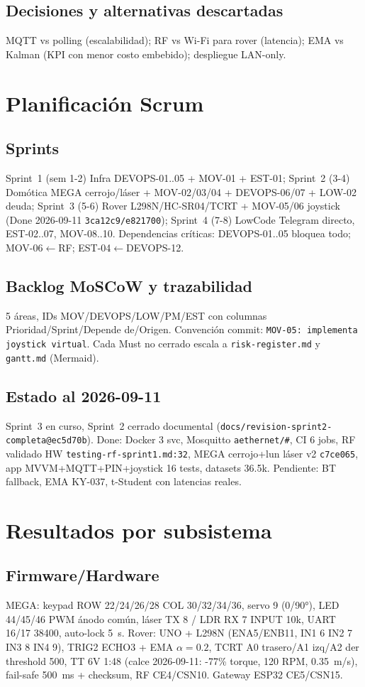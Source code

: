 \documentclass[conference]{IEEEtran}
\begin{document}
\subsection{Decisiones y alternativas descartadas}
MQTT vs polling (escalabilidad); RF vs Wi-Fi para rover (latencia); EMA vs Kalman (KPI con menor costo embebido); despliegue LAN-only.

\section{Planificación Scrum}
\subsection{Sprints}
Sprint~1 (sem 1-2) Infra DEVOPS-01..05 + MOV-01 + EST-01; Sprint~2 (3-4) Domótica MEGA cerrojo/láser + MOV-02/03/04 + DEVOPS-06/07 + LOW-02 deuda; Sprint~3 (5-6) Rover L298N/HC-SR04/TCRT + MOV-05/06 joystick (Done 2026-09-11 \texttt{3ca12c9/e821700}); Sprint~4 (7-8) LowCode Telegram directo, EST-02..07, MOV-08..10. Dependencias críticas: DEVOPS-01..05 bloquea todo; MOV-06$\leftarrow$RF; EST-04$\leftarrow$DEVOPS-12.

\subsection{Backlog MoSCoW y trazabilidad}
5 áreas, IDs MOV/DEVOPS/LOW/PM/EST con columnas Prioridad/Sprint/Depende de/Origen. Convención commit: \texttt{MOV-05: implementa joystick virtual}. Cada Must no cerrado escala a \texttt{risk-register.md} y \texttt{gantt.md} (Mermaid).

\subsection{Estado al 2026-09-11}
Sprint~3 en curso, Sprint~2 cerrado documental (\texttt{docs/revision-sprint2-completa@ec5d70b}). Done: Docker 3 svc, Mosquitto \texttt{aethernet/\#}, CI 6 jobs, RF validado HW \texttt{testing-rf-sprint1.md:32}, MEGA cerrojo+lun láser v2 \texttt{c7ce065}, app MVVM+MQTT+PIN+joystick 16 tests, datasets 36.5k. Pendiente: BT fallback, EMA KY-037, t-Student con latencias reales.

\section{Resultados por subsistema}
\subsection{Firmware/Hardware}
MEGA: keypad ROW 22/24/26/28 COL 30/32/34/36, servo 9 (0/90°), LED 44/45/46 PWM ánodo común, láser TX 8 / LDR RX 7 INPUT 10k, UART 16/17 38400, auto-lock 5~s. Rover: UNO + L298N (ENA5/ENB11, IN1 6 IN2 7 IN3 8 IN4 9), TRIG2 ECHO3 + EMA $\alpha=0.2$, TCRT A0 trasero/A1 izq/A2 der threshold 500, TT 6V 1:48 (calce 2026-09-11: -77\% torque, 120 RPM, 0.35~m/s), fail-safe 500~ms + checksum, RF CE4/CSN10. Gateway ESP32 CE5/CSN15.
\end{document}
